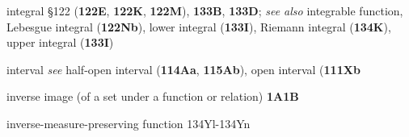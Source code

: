 integral \S122 ({\bf 122E}, {\bf 122K}, {\bf 122M}), {\bf 133B}, {\bf
133D}; 
  {\it see also}
integrable function, Lebesgue integral ({\bf 122Nb}),
lower integral ({\bf 133I}), Riemann integral ({\bf 134K}), upper integral ({\bf 133I})


























interval
  {\it see}
half-open interval ({\bf 114Aa}, {\bf 115Ab}),
open interval ({\bf 111Xb}





















 





inverse image (of a set under a function or relation) {\bf 1A1B}


inverse-measure-preserving function
134Yl-134Yn
















































